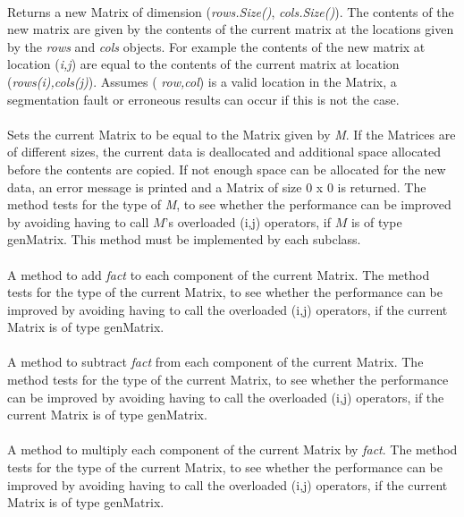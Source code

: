 \\ 
Returns a new Matrix of dimension ({\em rows.Size()}, {\em
cols.Size()}). The contents of the new matrix are given by the
contents of the current matrix at the locations given by the {\em
rows} and {\em cols} objects. For example the contents of the new
matrix at location ({\em i,j}) are equal to the contents of the
current matrix at location ({\em rows(i),cols(j)}). Assumes ({\em
row,col}) is a valid location in the Matrix, a segmentation fault or
erroneous results can occur if this is not the case. \\

\\
Sets the current Matrix to be equal to the Matrix given by {\em M}. If
the Matrices are of different sizes, the current data is deallocated
and additional space allocated before the contents are copied. If not
enough space can be allocated for the new data, an error message is
printed and a Matrix of size $0$ x $0$ is returned. The method tests
for the type of {\em M}, to see whether the performance can be
improved by avoiding having to call $M$'s overloaded (i,j) operators,
if $M$ is of type genMatrix. This method must be implemented by each
subclass. \\ 

 \\
A method to add {\em fact} to each component of the current Matrix. 
The method tests for the type of the current Matrix, to see whether
the performance can be improved by avoiding having to call the
overloaded (i,j) operators, if the current Matrix is of type
genMatrix. \\ 

 \\
A method to subtract {\em fact} from each component of the current Matrix. 
The method tests for the type of the current Matrix, to see whether
the performance can be improved by avoiding having to call the
overloaded (i,j) operators, if the current Matrix is of type
genMatrix. \\ 

 \\
A method to multiply each component of the current Matrix by {\em fact}. 
The method tests for the type of the current Matrix, to see whether
the performance can be improved by avoiding having to call the
overloaded (i,j) operators, if the current Matrix is of type
genMatrix. \\ 

